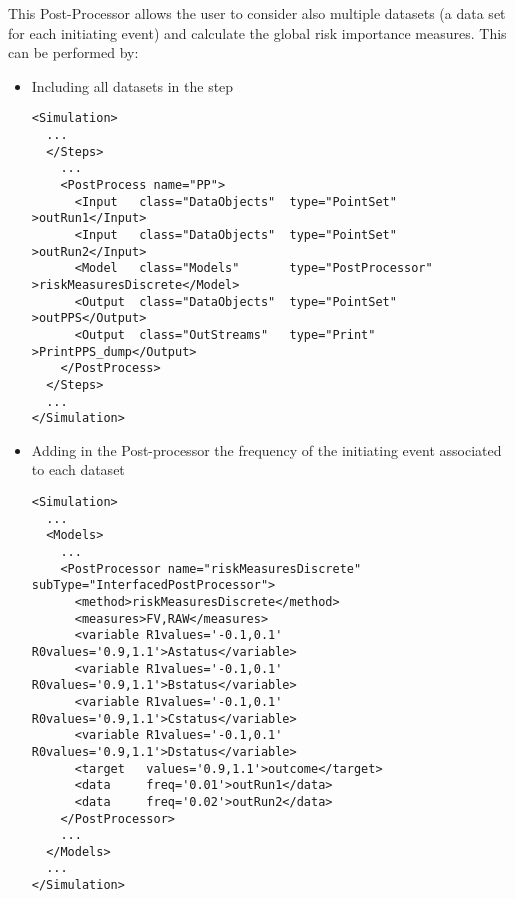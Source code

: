 This Post-Processor allows the user to consider also multiple datasets (a data set for each initiating event) and calculate the global risk importance measures.
This can be performed by:
\begin{itemize}
  \item Including all datasets in the step
\begin{lstlisting}[style=XML,morekeywords={subType,debug,name,class,type}]
<Simulation>
  ...
  </Steps>
    ...
    <PostProcess name="PP">
      <Input   class="DataObjects"  type="PointSet"        >outRun1</Input>
      <Input   class="DataObjects"  type="PointSet"        >outRun2</Input>
      <Model   class="Models"       type="PostProcessor"   >riskMeasuresDiscrete</Model>
      <Output  class="DataObjects"  type="PointSet"        >outPPS</Output>
      <Output  class="OutStreams"   type="Print"           >PrintPPS_dump</Output>
    </PostProcess>
  </Steps>
  ...
</Simulation>
\end{lstlisting}
  \item Adding in the Post-processor the frequency of the initiating event associated to each dataset
\begin{lstlisting}[style=XML,morekeywords={subType,debug,name,class,type}]
<Simulation>
  ...
  <Models>
    ...
    <PostProcessor name="riskMeasuresDiscrete" subType="InterfacedPostProcessor">
      <method>riskMeasuresDiscrete</method>
      <measures>FV,RAW</measures>
      <variable R1values='-0.1,0.1' R0values='0.9,1.1'>Astatus</variable>
      <variable R1values='-0.1,0.1' R0values='0.9,1.1'>Bstatus</variable>
      <variable R1values='-0.1,0.1' R0values='0.9,1.1'>Cstatus</variable>
      <variable R1values='-0.1,0.1' R0values='0.9,1.1'>Dstatus</variable>
      <target   values='0.9,1.1'>outcome</target>
      <data     freq='0.01'>outRun1</data>
      <data     freq='0.02'>outRun2</data>
    </PostProcessor>
    ...
  </Models>
  ...
</Simulation>
\end{lstlisting}

\end{itemize}

